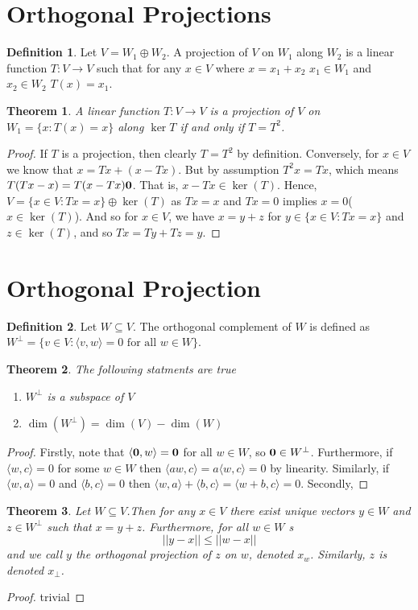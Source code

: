 \documentclass[oneside, 12pt]{book}
\newtheorem{thm}{Theorem}[section]
\theoremstyle{definition}
\newtheorem{defn}{Definition}[section]
\begin{document}
\section{Orthogonal Projections}
\begin{defn}
\label{defn_prj}
Let $V=W_{1}\oplus W_{2}$. A projection of $V$ on $W_{1}$ along $W_{2}$ is a linear function $T:V \to V$ such that for any $x \in V$ where $x=x_{1}+x_{2}$ $x_{1} \in W_{1}$ and $x_{2} \in W_{2}$ $T(x)=x_{1}$.
\end{defn}
\begin{thm}
\label{thm_projiff}
A linear function $T:V \to V$ is a projection of $V$ on $W_{1}=\{x : T(x)=x \}$ along $\ker{T}$ if and only if $T=T^{2}$.
\end{thm}
\begin{proof}
  If $T$ is a projection, then clearly $T=T^{2}$ by definition. Conversely, for $x \in V$ we know that $x=Tx+(x-Tx)$. But by assumption
  $T^{2}x=Tx$, which means $T(Tx-x)=T(x-Tx)\bold{0}$. That is, $x-Tx \in \ker(T)$. Hence, $V=\{x \in V: Tx=x\} \oplus \ker(T)$ as $Tx=x$ and $Tx=0$  implies $x=0$($x \in \ker(T)$). And so for $x \in V$, we have $x=y+z$ for $y \in \{x \in V: Tx=x\}$ and $z\in \ker(T)$, and so $Tx=Ty+Tz=y$.
\end{proof}
\section{Orthogonal Projection}
\begin{defn}
\label{orthcomp}
Let $W \subseteq V$. The orthogonal complement of $W$ is defined as $W^{\perp}=\{v \in V : \langle v, w \rangle=0 \text{ for all } w \in W\}$.
\end{defn}
\begin{thm}
The following statments are true
\begin{enumerate}
  \item $W^{\perp}$ is a subspace of $V$
  \item $\dim(W^{\perp})=\dim(V)-\dim(W)$
\end{enumerate}
\end{thm}
\begin{proof}
  Firstly, note that $ \langle \bold{0}, w\rangle=\bold{0}$ for all $w \in W$, so $\bold{0} \in W^{\perp}$. Furthermore, if $\langle w, c\rangle=0$ for some $w \in W$ then
  $\langle aw, c \rangle = a \langle w, c \rangle =0 $ by linearity. Similarly, if $\langle w, a \rangle=0  $ and $\langle b, c \rangle=0  $ then $\langle w, a \rangle+ \langle b, c \rangle= \langle w+b, c \rangle =0$. Secondly,
\end{proof}
\begin{thm}
\label{thm_orthodecomp}
  Let $W \subseteq V$.Then for any $x \in V$ there exist unique vectors $y \in W$ and $z \in W^{\perp}$ such that $x=y+z$. Furthermore, for all $w \in W$
s  \[ ||y-x|| \leq ||w-x||\] and we call $y$ the orthogonal projection of $z$ on $w$, denoted $x_{w}$. Similarly, $z$ is denoted $x_{\perp}$.
\end{thm}
\begin{proof}
trivial
\end{proof}
\end{document}
